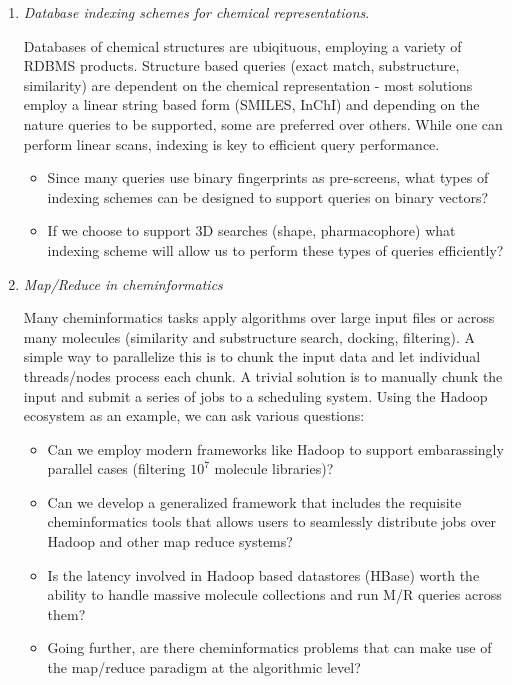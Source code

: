 \documentclass{sig-alternate}
\begin{document}
\begin{enumerate}
\item \emph{Database indexing schemes for chemical representations}. 

Databases of chemical structures are ubiqituous, employing a variety
of RDBMS products. Structure based queries (exact match, substructure,
similarity) are dependent on the chemical representation - most
solutions employ a linear string based form (SMILES, InChI) and
depending on the nature queries to be supported, some are preferred
over others. While one can perform linear scans, indexing is key to
efficient query performance.
\begin{itemize}
\item  Since many queries use binary fingerprints as pre-screens, what
  types of indexing schemes can be designed to support queries on
  binary vectors?
\item If we choose to support 3D searches (shape, pharmacophore) what
  indexing scheme will allow us to perform these types of queries
  efficiently?
\end{itemize}

\item \emph{Map/Reduce in cheminformatics}

  Many cheminformatics tasks apply algorithms over large input files
  or across many molecules (similarity and substructure search,
  docking, filtering). A simple way to parallelize this is to chunk
  the input data and let individual threads/nodes process each chunk. A
  trivial solution is to manually chunk the input and submit a series
  of jobs to a scheduling system. Using the Hadoop ecosystem as an
  example, we can ask various questions:
  \begin{itemize}
  \item Can we employ modern frameworks like Hadoop to support
    embarassingly parallel cases (filtering $10^7$ molecule libraries)?
  \item Can we develop a generalized framework that includes the
    requisite cheminformatics tools that allows users to seamlessly
    distribute jobs over Hadoop and other map reduce systems?
  \item Is the latency involved in Hadoop based datastores (HBase)
    worth the ability to handle massive molecule collections and run
    M/R queries across them? 
  \item Going further, are there cheminformatics problems that can make use
  of the map/reduce paradigm at the algorithmic level?
  \end{itemize}
\end{enumerate}
\end{document}

